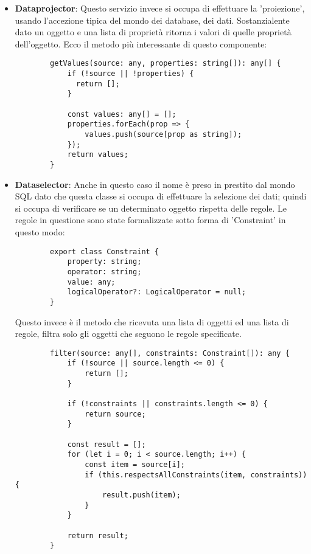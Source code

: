 \begin{itemize}
    \item {\bfseries Dataprojector}:
    Questo servizio invece si occupa di effettuare la 'proiezione', usando l'accezione tipica del mondo dei database, dei dati.
    Sostanzialente dato un oggetto e una lista di proprietà ritorna i valori di quelle proprietà dell'oggetto.
    Ecco il metodo più interessante di questo componente:
    \begin{lstlisting}
        getValues(source: any, properties: string[]): any[] {
            if (!source || !properties) {
              return [];
            }

            const values: any[] = [];
            properties.forEach(prop => {
                values.push(source[prop as string]);
            });
            return values;
        }
    \end{lstlisting}

    \item {\bfseries Dataselector}:
    Anche in questo caso il nome è preso in prestito dal mondo SQL dato che questa classe si occupa di effettuare la selezione dei dati;
    quindi si occupa di verificare se un determinato oggetto rispetta delle regole.
    Le regole in questione sono state formalizzate sotto forma di 'Constraint' in questo modo:

    \begin{lstlisting}
        export class Constraint {
            property: string;
            operator: string;
            value: any;
            logicalOperator?: LogicalOperator = null;
        }
    \end{lstlisting}

    Questo invece è il metodo che ricevuta una lista di oggetti ed una lista di regole, filtra solo gli oggetti che seguono le regole specificate.
    \begin{lstlisting}
        filter(source: any[], constraints: Constraint[]): any {
            if (!source || source.length <= 0) {
                return [];
            }

            if (!constraints || constraints.length <= 0) {
                return source;
            }

            const result = [];
            for (let i = 0; i < source.length; i++) {
                const item = source[i];
                if (this.respectsAllConstraints(item, constraints)) {
                    result.push(item);
                }
            }

            return result;
        }
    \end{lstlisting}


\end{itemize}
